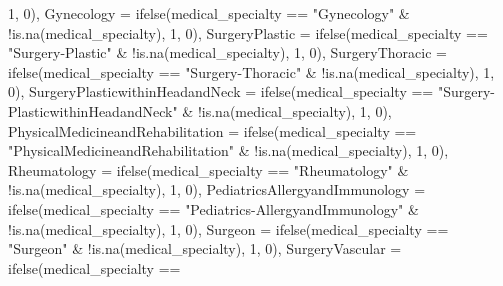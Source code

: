 \documentclass[
]{article}
\newenvironment{Shaded}{\begin{snugshade}}{\end{snugshade}}
\newcommand{\AttributeTok}[1]{\textcolor[rgb]{0.77,0.63,0.00}{#1}}
\newcommand{\DecValTok}[1]{\textcolor[rgb]{0.00,0.00,0.81}{#1}}
\newcommand{\FunctionTok}[1]{\textcolor[rgb]{0.00,0.00,0.00}{#1}}
\newcommand{\NormalTok}[1]{#1}
\newcommand{\SpecialCharTok}[1]{\textcolor[rgb]{0.00,0.00,0.00}{#1}}
\newcommand{\StringTok}[1]{\textcolor[rgb]{0.31,0.60,0.02}{#1}}
\begin{document}
\begin{Shaded}
\begin{Highlighting}[]
            \DecValTok{1}\NormalTok{, }\DecValTok{0}\NormalTok{), }\AttributeTok{Gynecology =} \FunctionTok{ifelse}\NormalTok{(medical\_specialty }\SpecialCharTok{==}
            \StringTok{"Gynecology"} \SpecialCharTok{\&} \SpecialCharTok{!}\FunctionTok{is.na}\NormalTok{(medical\_specialty),}
            \DecValTok{1}\NormalTok{, }\DecValTok{0}\NormalTok{), }\AttributeTok{SurgeryPlastic =} \FunctionTok{ifelse}\NormalTok{(medical\_specialty }\SpecialCharTok{==}
            \StringTok{"Surgery{-}Plastic"} \SpecialCharTok{\&} \SpecialCharTok{!}\FunctionTok{is.na}\NormalTok{(medical\_specialty),}
            \DecValTok{1}\NormalTok{, }\DecValTok{0}\NormalTok{), }\AttributeTok{SurgeryThoracic =} \FunctionTok{ifelse}\NormalTok{(medical\_specialty }\SpecialCharTok{==}
            \StringTok{"Surgery{-}Thoracic"} \SpecialCharTok{\&} \SpecialCharTok{!}\FunctionTok{is.na}\NormalTok{(medical\_specialty),}
            \DecValTok{1}\NormalTok{, }\DecValTok{0}\NormalTok{), }\AttributeTok{SurgeryPlasticwithinHeadandNeck =} \FunctionTok{ifelse}\NormalTok{(medical\_specialty }\SpecialCharTok{==}
            \StringTok{"Surgery{-}PlasticwithinHeadandNeck"} \SpecialCharTok{\&} \SpecialCharTok{!}\FunctionTok{is.na}\NormalTok{(medical\_specialty),}
            \DecValTok{1}\NormalTok{, }\DecValTok{0}\NormalTok{), }\AttributeTok{PhysicalMedicineandRehabilitation =} \FunctionTok{ifelse}\NormalTok{(medical\_specialty }\SpecialCharTok{==}
            \StringTok{"PhysicalMedicineandRehabilitation"} \SpecialCharTok{\&} \SpecialCharTok{!}\FunctionTok{is.na}\NormalTok{(medical\_specialty),}
            \DecValTok{1}\NormalTok{, }\DecValTok{0}\NormalTok{), }\AttributeTok{Rheumatology =} \FunctionTok{ifelse}\NormalTok{(medical\_specialty }\SpecialCharTok{==}
            \StringTok{"Rheumatology"} \SpecialCharTok{\&} \SpecialCharTok{!}\FunctionTok{is.na}\NormalTok{(medical\_specialty),}
            \DecValTok{1}\NormalTok{, }\DecValTok{0}\NormalTok{), }\AttributeTok{PediatricsAllergyandImmunology =} \FunctionTok{ifelse}\NormalTok{(medical\_specialty }\SpecialCharTok{==}
            \StringTok{"Pediatrics{-}AllergyandImmunology"} \SpecialCharTok{\&} \SpecialCharTok{!}\FunctionTok{is.na}\NormalTok{(medical\_specialty),}
            \DecValTok{1}\NormalTok{, }\DecValTok{0}\NormalTok{), }\AttributeTok{Surgeon =} \FunctionTok{ifelse}\NormalTok{(medical\_specialty }\SpecialCharTok{==}
            \StringTok{"Surgeon"} \SpecialCharTok{\&} \SpecialCharTok{!}\FunctionTok{is.na}\NormalTok{(medical\_specialty),}
            \DecValTok{1}\NormalTok{, }\DecValTok{0}\NormalTok{), }\AttributeTok{SurgeryVascular =} \FunctionTok{ifelse}\NormalTok{(medical\_specialty }\SpecialCharTok{==}

\end{Highlighting}
\end{Shaded}
\end{document}
